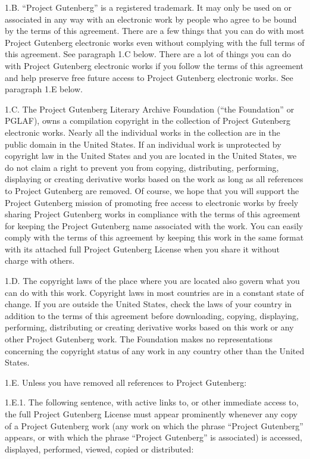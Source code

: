 \documentclass[12pt,openright]{book}
\begin{document}
1.B. “Project Gutenberg” is a registered trademark. It may only be used on or associated in any way with an electronic work by people who agree to be bound by the terms of this agreement. There are a few things that you can do with most Project Gutenberg electronic works even without complying with the full terms of this agreement. See paragraph 1.C below. There are a lot of things you can do with Project Gutenberg electronic works if you follow the terms of this agreement and help preserve free future access to Project Gutenberg electronic works. See paragraph 1.E below.

1.C. The Project Gutenberg Literary Archive Foundation (“the Foundation” or PGLAF), owns a compilation copyright in the collection of Project Gutenberg electronic works. Nearly all the individual works in the collection are in the public domain in the United States. If an individual work is unprotected by copyright law in the United States and you are located in the United States, we do not claim a right to prevent you from copying, distributing, performing, displaying or creating derivative works based on the work as long as all references to Project Gutenberg are removed. Of course, we hope that you will support the Project Gutenberg mission of promoting free access to electronic works by freely sharing Project Gutenberg works in compliance with the terms of this agreement for keeping the Project Gutenberg name associated with the work. You can easily comply with the terms of this agreement by keeping this work in the same format with its attached full Project Gutenberg License when you share it without charge with others.

1.D. The copyright laws of the place where you are located also govern what you can do with this work. Copyright laws in most countries are in a constant state of change. If you are outside the United States, check the laws of your country in addition to the terms of this agreement before downloading, copying, displaying, performing, distributing or creating derivative works based on this work or any other Project Gutenberg work. The Foundation makes no representations concerning the copyright status of any work in any country other than the United States.

1.E. Unless you have removed all references to Project Gutenberg:

1.E.1. The following sentence, with active links to, or other immediate access to, the full Project Gutenberg License must appear prominently whenever any copy of a Project Gutenberg work (any work on which the phrase “Project Gutenberg” appears, or with which the phrase “Project Gutenberg” is associated) is accessed, displayed, performed, viewed, copied or distributed:
\end{document}
